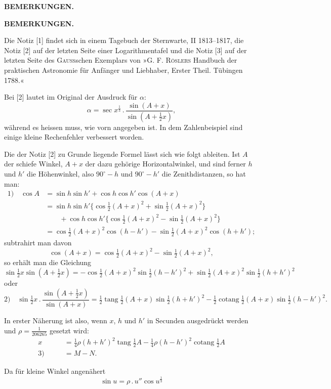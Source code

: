 \par\clearpage
\noindent{}\hfill{\small\textbf{BEMERKUNGEN.}}\hfill\null\par\bigskip
\begingroup\small
\begin{center}\vspace{2cm}\textbf{BEMERKUNGEN.}\end{center}
\par\noindent\hspace*{\parindent}Die Notiz [1] findet sich in einem Tagebuch der Sternwarte, II 1813--1817, die Notiz [2] auf der letzten Seite einer Logarithmentafel und die Notiz [3] auf der letzten Seite des \textsc{Gauss}schen Exemplars von »G. F. \textsc{Röslers} Handbuch der praktischen Astronomie für Anfänger und Liebhaber, Erster Theil. Tübingen 1788.«
\par\noindent\hspace*{\parindent}Bei [2] lautet im Original der Ausdruck für $\alpha$:
\[
\alpha=\sec x^{\frac13}\,.\,\frac{\sin(A+x)}{\sin(A+\frac12x)},
\]
\noindent während es heissen muss, wie vorn angegeben ist. In dem Zahlenbeispiel sind einige kleine Rechenfehler verbessert worden.
\par\noindent\hspace*{\parindent}Die der Notiz [2] zu Grunde liegende Formel lässt sich wie folgt ableiten. Ist $A$ der schiefe Winkel, $A+x$ der dazu gehörige Horizontalwinkel, und sind ferner $h$ und $h'$ die Höhenwinkel, also $90^\circ-h$ und $90^\circ-h'$ die Zenithdistanzen, so hat man:
\[
\begin{aligned}
\text{1)}\quad\cos A&=\sin h\sin h'+\cos h\cos h'\cos(A+x)\\
&=\sin h\sin h'\{\cos\tfrac12(A+x)^2+\sin\tfrac12(A+x)^2\}\\
&\qquad+\cos h\cos h'\{\cos\tfrac12(A+x)^2-\sin\tfrac12(A+x)^2\}\\
&=\cos\tfrac12(A+x)^2\cos(h-h')-\sin\tfrac12(A+x)^2\cos(h+h');
\end{aligned}
\]
\noindent subtrahirt man davon
\[
\cos(A+x)=\cos\tfrac12(A+x)^2-\sin\tfrac12(A+x)^2,
\]
\noindent so erhält man die Gleichung
\[
\sin\tfrac12x\sin(A+\tfrac12x)=-\cos\tfrac12(A+x)^2\sin\tfrac12(h-h')^2+\sin\tfrac12(A+x)^2\sin\tfrac12(h+h')^2
\]
\noindent oder
\[
\text{2)}\quad\sin\tfrac12x\,.\,\frac{\sin(A+\frac12x)}{\sin(A+x)}
=\tfrac12\operatorname{tang}\tfrac12(A+x)\sin\tfrac12(h+h')^2-\tfrac12\operatorname{cotang}\tfrac12(A+x)\sin\tfrac12(h-h')^2.
\]
\par\noindent\hspace*{\parindent}In erster Näherung ist also, wenn $x$, $h$ und $h'$ in Secunden ausgedrückt werden und $\rho=\frac1{206265}$ gesetzt wird:
\[
\begin{aligned}
x&=\tfrac14\rho(h+h')^2\operatorname{tang}\tfrac12A-\tfrac14\rho(h-h')^2\operatorname{cotang}\tfrac12A\\
\text{3)}\qquad&=M-N.
\end{aligned}
\]
\par\noindent\hspace*{\parindent}Da für kleine Winkel angenähert
\[
\sin u=\rho\,.\,u''\cos u^{\frac13}
\]
\par\endgroup

